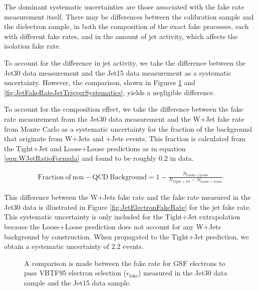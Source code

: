 \documentclass{cmspaper}
\begin{document}

The dominant systematic uncertainties are those associated with the fake rate measurement itself. There may be differences between the calibration sample and the dielectron sample, in both the composition of the exact fake processes, each with different fake rates, and in the amount of jet activity, which affects the isolation fake rate. 

To account for the difference in jet activity, we take the difference between the Jet30 data measurement and the Jet15 data measurement as a systematic uncertainty. However, the comparison, shown in Figures \ref{fig:RecoFakeRateJetTriggerSystematics} and \ref{fig:JetFakeRateJetTriggerSystematics}, yields a negligible difference. 

To account for the composition effect, we take the difference between the fake rate measurement from the Jet30 data measurement and the W+Jet fake rate from Monte Carlo as a systematic uncertainty for the fraction of the background that originate from W+Jets and \GAM+Jets events. This fraction is calculated from the Tight+Jet and Loose+Loose predictions as in equation \ref{eqn:WJetRatioFormula} and found to be roughly $0.2$ in data. 

\begin{eqnarray}
  \label{eqn:WJetRatioFormula}  
\mathrm{Fraction\ of\ non-QCD\ Background} = 1 - \frac{N_{\mathrm{Loose+Loose}}}{N_{\mathrm{Tight+Jet}} - N_{\mathrm{Loose+Loose}}}
\end{eqnarray}

This difference between the W+Jets fake rate and the fake rate measured in the Jet30 data is illustrated in Figure \ref{fig:JetElectronFakeRate} for the jet fake rate.  This systematic uncertainty is only included for the Tight+Jet extrapolation because the Loose+Loose prediction does not account for any W+Jets background by construction. When propagated to the Tight+Jet prediction, we obtain a systematic uncertainty of $2.2$ events.

\begin{figure}[htb]
  \begin{center}
    \caption{A comparison is made between the fake rate for GSF electrons to pass VBTF95 electron selection ($\epsilon_{\mathrm{fake}}$) measured in the Jet30 data sample and the Jet15 data sample.}
    \label{fig:RecoFakeRateJetTriggerSystematics}
  \end{center}
\end{figure}
\end{document}
